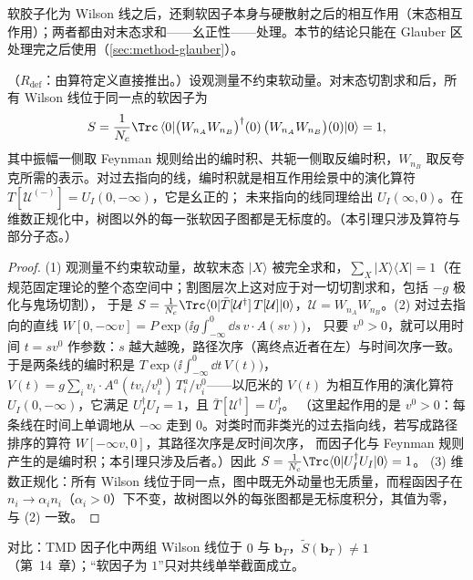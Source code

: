 软胶子化为 Wilson 线之后，还剩软因子本身与硬散射之后的相互作用（末态相互作用）；两者都由对末态求和——幺正性——处理。本节的结论只能在 Glauber 区处理完之后使用（\cref{sec:method-glauber}）。

\begin{lemma}\label{lem:method-soft-unitarity}
（$R_{\mathrm{def}}$：由算符定义直接推出。）设观测量不约束软动量。对末态切割求和后，所有 Wilson 线位于同一点的软因子为
\begin{equation}\label{eq:method-soft-one}
S=\frac1{N_c}\Trc\,\langle0|\bigl(W_{n_A}W_{n_B}\bigr)^\dagger(0)\,\bigl(W_{n_A}W_{n_B}\bigr)(0)|0\rangle=1 ,
\end{equation}
其中振幅一侧取 Feynman 规则给出的编时积、共轭一侧取反编时积，$W_{n_B}$ 取反夸克所需的表示。对过去指向的线，编时积就是相互作用绘景中的演化算符 $T[\mathcal U^{(-)}]=U_I(0,-\infty)$，它是幺正的；
未来指向的线同理给出 $U_I(\infty,0)$。在维数正规化中，树图以外的每一张软因子图都是无标度的。（本引理只涉及算符与部分子态。）
\end{lemma}

\begin{proof}
(1) 观测量不约束软动量，故软末态 $|X\rangle$ 被完全求和，$\sum_X|X\rangle\langle X|=1$（在规范固定理论的整个态空间中；割图层次上这对应于对一切切割求和，包括 $-g$ 极化与鬼场切割），
于是 $S=\frac1{N_c}\Trc\langle0|\bar T[\mathcal U^\dagger]\,T[\mathcal U]|0\rangle$，$\mathcal U=W_{n_A}W_{n_B}$。(2) 对过去指向的直线 $W[0,-\infty v]=P\exp\bigl(\ii g\int_{-\infty}^0\dd s\,v\cdot A(sv)\bigr)$，
只要 $v^0>0$，就可以用时间 $t=sv^0$ 作参数：$s$ 越大越晚，路径次序（离终点近者在左）与时间次序一致。于是两条线的编时积是
$T\exp\bigl(\ii\int_{-\infty}^0\dd t\,V(t)\bigr)$，$V(t)=g\sum_iv_i\cdot A^a(tv_i/v_i^0)\,T_i^a/v_i^0$——以厄米的 $V(t)$ 为相互作用的演化算符 $U_I(0,-\infty)$，它满足 $U_I^\dagger U_I=1$，且 $\bar T[\mathcal U^\dagger]=U_I^\dagger$。
（这里起作用的是 $v^0>0$：每条线在时间上单调地从 $-\infty$ 走到 $0$。对类时而非类光的过去指向线，若写成路径排序的算符 $W[-\infty v,0]$，其路径次序是\emph{反}时间次序，
而因子化与 Feynman 规则产生的是编时积；本引理只涉及后者。）因此 $S=\frac1{N_c}\Trc\langle0|U_I^\dagger U_I|0\rangle=1$。
(3) 维数正规化：所有 Wilson 线位于同一点，图中既无外动量也无质量，而程函因子在 $n_i\to\alpha_in_i$（$\alpha_i>0$）下不变，故树图以外的每张图都是无标度积分，其值为零，与 (2) 一致。
\end{proof}

对比：TMD 因子化中两组 Wilson 线位于 $0$ 与 $\mathbf b_T$，$\tilde S(\mathbf b_T)\ne1$（第~14~章）；“软因子为 $1$”只对共线单举截面成立。

